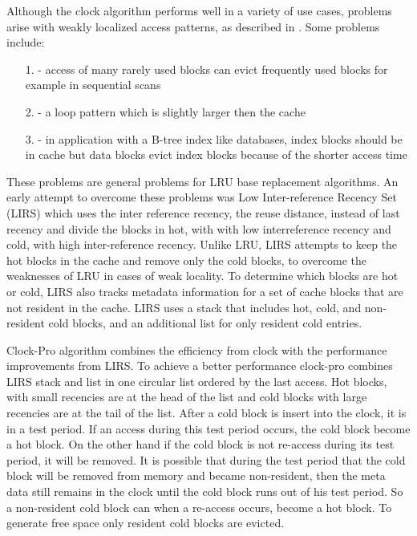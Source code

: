 \documentclass[
	12pt,
	a4paper,
	abstract,
	bibliography=totoc,
	chapterprefix,
	headings=openright,
	numbers=endperiod,
	parskip=half,
	twoside,
]{scrreprt}
\begin{document}
Although the clock algorithm performs well in a variety of use cases, problems arise with weakly localized access patterns, as described in \cite{jiang2005making}.
Some problems include:
\begin{itemize}
	\item[1.] - access of many rarely used blocks can evict frequently used blocks for example in sequential scans
	\item[2.] - a loop pattern which is slightly larger then the cache 
	\item[3.] - in application with a B-tree index like databases, index blocks should be in cache but data blocks
				evict index blocks because of the shorter access time
\end{itemize}

These problems are general problems for LRU base replacement algorithms.
An early attempt to overcome these problems was Low Inter-reference Recency Set (LIRS) \cite{10.1145/511399.511340} which uses the inter reference recency, the reuse distance, instead of last recency and divide the blocks in hot, with with low interreference recency and cold, with high inter-reference recency.
Unlike LRU, LIRS attempts to keep the hot blocks in the cache and remove only the cold blocks, to overcome the weaknesses of LRU in cases of weak locality.
To determine which blocks are hot or cold, LIRS also tracks metadata information for a set of cache blocks that are not resident in the cache.
LIRS uses a stack that includes hot, cold, and non-resident cold blocks, and an additional list for only resident cold entries.

Clock-Pro algorithm \cite{jiang2005clock} combines the efficiency from clock with the performance improvements from LIRS.
To achieve a better performance clock-pro combines LIRS stack and list in one circular list ordered by the last access.
Hot blocks, with small recencies are at the head of the list and cold blocks with large recencies are at the tail of the list.
After a cold block is insert into the clock, it is in a test period.
If an access during this test period occurs, the cold block become a hot block.
On the other hand if the cold block is not re-access during its test period, it will be removed.
It is possible that during the test period that the cold block will be removed from memory and became non-resident, then the meta data still remains in the clock until the cold block runs out of his test period.
So a non-resident cold block can when a re-access occurs, become a hot block.
To generate free space only resident cold blocks are evicted.
\end{document}
